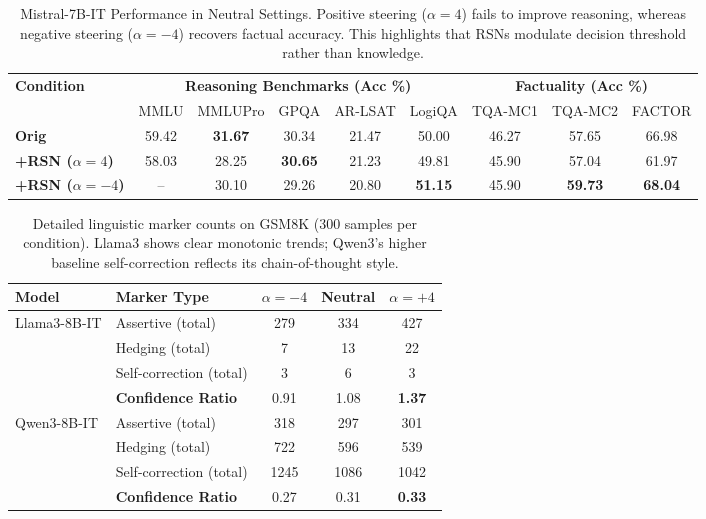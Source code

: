 \documentclass{article}
\begin{document}
\begin{table}[t]
\centering
\small
\caption{Mistral-7B-IT Performance in Neutral Settings. Positive steering ($\alpha=4$) fails to improve reasoning, whereas negative steering ($\alpha=-4$) recovers factual accuracy. This highlights that RSNs modulate decision threshold rather than knowledge.}
\label{tab:app-mistral-neutral}
\setlength{\tabcolsep}{5pt}
\renewcommand{\arraystretch}{1.1}
\begin{tabular}{l | ccccc | ccc}
\toprule
\multirow{2}{*}{\textbf{Condition}}
& \multicolumn{5}{c|}{\textbf{Reasoning Benchmarks (Acc \%)}}
& \multicolumn{3}{c}{\textbf{Factuality (Acc \%)}} \\
& MMLU & MMLUPro& GPQA & AR-LSAT & LogiQA
& TQA-MC1 & TQA-MC2 & FACTOR \\
\midrule
\textbf{Orig}
& 59.42 & \textbf{31.67} & 30.34 & 21.47 & 50.00& 46.27 & 57.65 & 66.98 \\
\textbf{+RSN ($\alpha=4$)}
& 58.03 & 28.25 & \textbf{30.65} & 21.23 & 49.81
& 45.90 & 57.04 & 61.97 \\
\textbf{+RSN ($\alpha=-4$)}
& -- & 30.10& 29.26& 20.80& \textbf{51.15}& 45.90 & \textbf{59.73} & \textbf{68.04} \\
\bottomrule
\end{tabular}
\end{table}

\begin{table}[t]
\centering
\small
\caption{Detailed linguistic marker counts on GSM8K (300 samples per condition). Llama3 shows clear monotonic trends; Qwen3's higher baseline self-correction reflects its chain-of-thought style.}
\label{tab:gsm8k-markers}
\setlength{\tabcolsep}{5pt}
\renewcommand{\arraystretch}{1.05}
\begin{tabular}{l l ccc}
\toprule
\textbf{Model} & \textbf{Marker Type} & $\alpha=-4$ & \textbf{Neutral} & $\alpha=+4$ \\
\midrule
\multirow{4}{*}{Llama3-8B-IT}
 & Assertive (total)      & 279  & 334  & 427  \\
 & Hedging (total)        & 7    & 13   & 22   \\
 & Self-correction (total)& 3    & 6    & 3    \\
 & \textbf{Confidence Ratio} & 0.91 & 1.08 & \textbf{1.37} \\
\midrule
\multirow{4}{*}{Qwen3-8B-IT}
 & Assertive (total)      & 318  & 297  & 301  \\
 & Hedging (total)        & 722  & 596  & 539  \\
 & Self-correction (total)& 1245 & 1086 & 1042 \\
 & \textbf{Confidence Ratio} & 0.27 & 0.31 & \textbf{0.33} \\
\bottomrule
\end{tabular}
\end{table}
\end{document}
